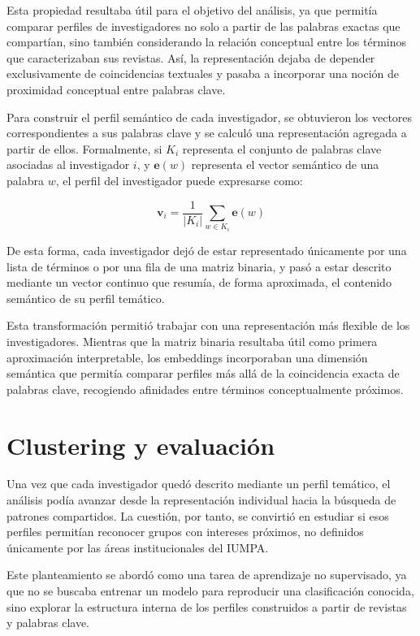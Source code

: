 \documentclass[11pt,spanish,listoffigures,listoftables]{tfgetsinf}
\begin{document}
Esta propiedad resultaba útil para el objetivo del análisis, ya que permitía comparar perfiles de investigadores no solo a partir de las palabras exactas que compartían, sino también considerando la relación conceptual entre los términos que caracterizaban sus revistas. Así, la representación dejaba de depender exclusivamente de coincidencias textuales y pasaba a incorporar una noción de proximidad conceptual entre palabras clave.

Para construir el perfil semántico de cada investigador, se obtuvieron los vectores correspondientes a sus palabras clave y se calculó una representación agregada a partir de ellos. Formalmente, si \(K_i\) representa el conjunto de palabras clave asociadas al investigador \(i\), y \(\mathbf{e}(w)\) representa el vector semántico de una palabra \(w\), el perfil del investigador puede expresarse como:

\[
\mathbf{v}_i = \frac{1}{|K_i|}\sum_{w \in K_i} \mathbf{e}(w)
\]

De esta forma, cada investigador dejó de estar representado únicamente por una lista de términos o por una fila de una matriz binaria, y pasó a estar descrito mediante un vector continuo que resumía, de forma aproximada, el contenido semántico de su perfil temático.

Esta transformación permitió trabajar con una representación más flexible de los investigadores. Mientras que la matriz binaria resultaba útil como primera aproximación interpretable, los embeddings incorporaban una dimensión semántica que permitía comparar perfiles más allá de la coincidencia exacta de palabras clave, recogiendo afinidades entre términos conceptualmente próximos.

\section{Clustering y evaluación}

Una vez que cada investigador quedó descrito mediante un perfil temático, el análisis podía avanzar desde la representación individual hacia la búsqueda de patrones compartidos. La cuestión, por tanto, se convirtió en estudiar si esos perfiles permitían reconocer grupos con intereses próximos, no definidos únicamente por las áreas institucionales del IUMPA.

Este planteamiento se abordó como una tarea de aprendizaje no supervisado, ya que no se buscaba entrenar un modelo para reproducir una clasificación conocida, sino explorar la estructura interna de los perfiles construidos a partir de revistas y palabras clave.
\end{document}
